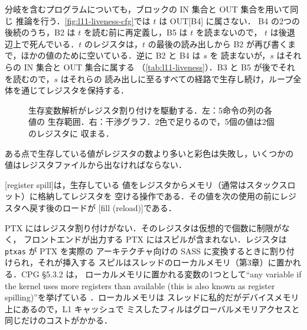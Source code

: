 \documentclass[../main.tex]{subfiles}
\begin{document}
分岐を含むプログラムについても，ブロックの IN 集合と OUT 集合を用いて同じ
推論を行う．\cref{fig:l11-liveness-cfg}では $t$ は OUT[B4] に属さない．
B4 の2つの後続のうち，B2 は $t$ を読む前に再定義し，B5 は $t$ を読まないので，
$t$ は後退辺上で死んでいる．$t$ のレジスタは，$t$ の最後の読み出しから
B2 が再び書くまで，ほかの値のために空いている．逆に B2 と B4 は $s$ を
読まないが，$s$ はそれらの IN 集合と OUT 集合に属する
（\cref{tab:l11-liveness}）．B3 と B5 が後でそれを読むので，$s$ はそれらの
読み出しに至るすべての経路で生存し続け，ループ全体を通じてレジスタを保持する．

\begin{figure}[tb]
  \centering
  
  \caption{生存変数解析がレジスタ割り付けを駆動する．左：5命令の列の各値の
    生存範囲．右：干渉グラフ．2色で足りるので，5個の値は2個のレジスタに
    収まる．}
  \label{fig:l11-interference}
\end{figure}

ある点で生存している値がレジスタの数より多いと彩色は失敗し，いくつかの
値はレジスタファイルから出なければならない．

\begin{definition}[スピルとフィル]
  \label{def:l11-spill}
  [register spill]は，生存している
  値をレジスタからメモリ（通常はスタックスロット）に格納してレジスタを
  空ける操作である．その値を次の使用の前にレジスタへ戻す後のロードが
  [fill (reload)]である．
\end{definition}

PTX にはレジスタ割り付けがない．そのレジスタは仮想的で個数に制限がなく，
フロントエンドが出力する PTX にはスピルが含まれない．レジスタは \texttt{ptxas} が PTX を実際の
アーキテクチャ向けの SASS に変換するときに割り付けられ，それが挿入する
スピルはスレッドのローカルメモリ（第3章）に置かれる．CPG §5.3.2 は，
ローカルメモリに置かれる変数の1つとして\enquote{any variable if the kernel
uses more registers than available (this is also known as register
spilling)}を挙げている \cite{nvidia2024cudaguide}．ローカルメモリは
スレッドに私的だがデバイスメモリ上にあるので，L1 キャッシュで
ミスしたフィルはグローバルメモリアクセスと同じだけのコストがかかる．
\end{document}
